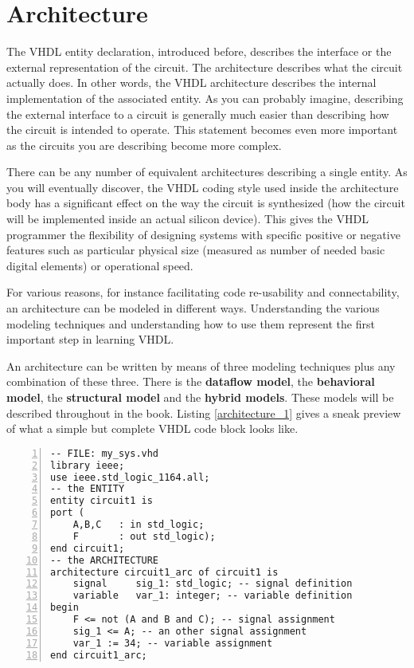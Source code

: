\section{Architecture}
The VHDL entity declaration, introduced before, describes the interface or the external representation of the circuit. The architecture describes what the circuit actually does. In other words, the VHDL architecture describes the internal implementation of the associated entity. As you can probably imagine, describing the external interface to a circuit is generally much easier than describing how the circuit is intended to operate. This statement becomes even more important as the circuits you are describing become more complex.

There can be any number of equivalent architectures describing a single entity. As you will eventually discover, the VHDL coding style used inside the architecture body has a significant effect on the way the circuit is synthesized (how the circuit will be implemented inside an actual silicon device). This gives the VHDL programmer the flexibility of designing systems with specific positive or negative features such as particular physical size (measured as number of needed basic digital elements) or operational speed.

For various reasons, for instance facilitating code re-usability and connectability, an architecture can be modeled in different ways. Understanding the various modeling techniques and understanding how to use them represent the first important step in learning VHDL.

An architecture can be written by means of three modeling techniques plus any combination of these three. There is the \textbf{dataflow model}, the \textbf{behavioral model}, the \textbf{structural model} and the \textbf{hybrid models}. These models will be described throughout in the book. Listing \ref{architecture_1} gives a sneak preview of what a simple but complete VHDL code block looks like.
\begin{lstlisting}[numbers=left, label=architecture_1, caption=Example of a simple VHDL block.]
-- FILE: my_sys.vhd
library ieee;
use ieee.std_logic_1164.all;
-- the ENTITY
entity circuit1 is
port (
    A,B,C   : in std_logic;
    F       : out std_logic);
end circuit1;
-- the ARCHITECTURE
architecture circuit1_arc of circuit1 is
	signal     sig_1: std_logic; -- signal definition
	variable   var_1: integer; -- variable definition
begin
	F <= not (A and B and C); -- signal assignment
	sig_1 <= A; -- an other signal assignment
	var_1 := 34; -- variable assignment
end circuit1_arc;
\end{lstlisting}
